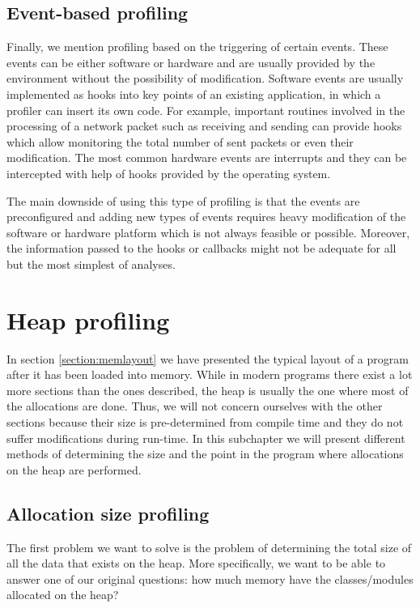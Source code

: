 \subsection{Event-based profiling}
\label{subsection:eventbasedprofiling}

Finally, we mention profiling based on the triggering of certain events. These events can be either software or hardware and are usually provided by the environment without the possibility of modification. Software events are usually implemented as hooks into key points of an existing application, in which a profiler can insert its own code. For example, important routines involved in the processing of a network packet such as receiving and sending can provide hooks which allow monitoring the total number of sent packets or even their modification. The most common hardware events are interrupts and they can be intercepted with help of hooks provided by the operating system.

The main downside of using this type of profiling is that the events are preconfigured and adding new types of events requires heavy modification of the software or hardware platform which is not always feasible or possible. Moreover, the information passed to the hooks or callbacks might not be adequate for all but the most simplest of analyses.

\section{Heap profiling}
\label{section:heapprofiling}

In section \ref{section:memlayout} we have presented the typical layout of a program after it has been loaded into memory. While in modern programs there exist a lot more sections than the ones described, the heap is usually the one where most of the allocations are done. Thus, we will not concern ourselves with the other sections because their size is pre-determined from compile time and they do not suffer modifications during run-time. In this subchapter we will present different methods of determining the size and the point in the program where allocations on the heap are performed.

\subsection{Allocation size profiling}
\label{subsubsection:allocationsizeprofiling}

The first problem we want to solve is the problem of determining the total size of all the data that exists on the heap. More specifically, we want to be able to answer one of our original questions: how much memory have the classes/modules allocated on the heap?

